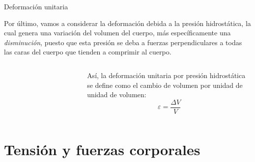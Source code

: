 \documentclass[11pt,handout,aspectratio=1610]{beamer}
\begin{document}
\begin{frame}{Deformación unitaria}

    Por último, vamos a considerar la deformación debida a la presión hidrostática, la cual genera una variación del volumen del cuerpo, más específicamente una \emph{disminución}, puesto que esta presión se deba a fuerzas perpendiculares a todas las caras del cuerpo que tienden a comprimir al cuerpo.

    \begin{columns}
        \begin{column}{0.5\textwidth}
            \begin{figure}
                \centering
                \begin{subfigure}{\textwidth}
                    \centering
                    \includegraphics{../figs/fluid_dynamics_pressure-2.pdf}
                \end{subfigure}
            \end{figure}
        \end{column}
        \begin{column}{0.5\textwidth}
            Así, la deformación unitaria por presión hidrostática se define como el cambio de volumen por unidad de unidad de volumen: $$ \varepsilon = \frac{\Delta V}{V} $$
        \end{column}
    \end{columns}

\end{frame}

\section{Tensión y fuerzas corporales}
\end{document}
